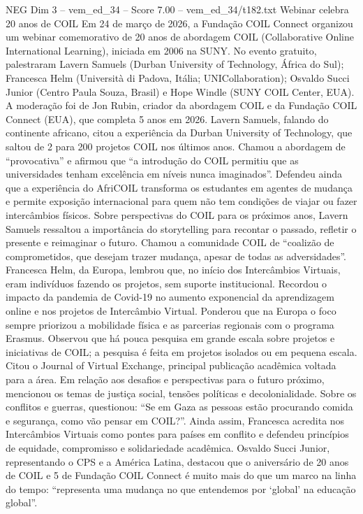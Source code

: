 \begin{textsample}{NEG Dim 3 – vem\_ed\_34 – Score 7.00 – vem\_ed\_34/t182.txt}  \label{ex:f3_neg_125}
Webinar celebra 20 anos de COIL Em 24 de março de 2026, a Fundação COIL Connect organizou um webinar comemorativo de 20 anos de abordagem COIL (Collaborative Online International Learning), iniciada em 2006 na SUNY.
No evento gratuito, palestraram Lavern Samuels (Durban University of Technology, África do Sul); Francesca Helm (Università di Padova, Itália; UNICollaboration); Osvaldo Succi Junior (Centro Paula Souza, Brasil) e Hope Windle (SUNY COIL Center, EUA).
A moderação foi de Jon Rubin, criador da abordagem COIL e da Fundação COIL Connect (EUA), que completa 5 anos em 2026.
Lavern Samuels, falando do continente africano, citou a experiência da Durban University of Technology, que saltou de 2 para 200 projetos COIL nos últimos anos.
Chamou a abordagem de “provocativa” e afirmou que “a introdução do COIL permitiu que as universidades tenham excelência em níveis nunca imaginados”.
Defendeu ainda que a experiência do AfriCOIL transforma os estudantes em agentes de mudança e permite exposição internacional para quem não tem condições de viajar ou fazer intercâmbios físicos.
Sobre perspectivas do COIL para os próximos anos, Lavern Samuels ressaltou a importância do storytelling para recontar o passado, refletir o presente e reimaginar o futuro.
Chamou a comunidade COIL de “coalizão de comprometidos, que desejam trazer mudança, apesar de todas as adversidades”.
Francesca Helm, da Europa, lembrou que, no início dos Intercâmbios Virtuais, eram indivíduos fazendo os projetos, sem suporte institucional.
Recordou o impacto da pandemia de Covid-19 no aumento exponencial da aprendizagem online e nos projetos de Intercâmbio Virtual.
Ponderou que na Europa o foco sempre priorizou a mobilidade física e as parcerias regionais com o programa Erasmus.
Observou que há pouca pesquisa em grande escala sobre projetos e iniciativas de COIL; a pesquisa é feita em projetos isolados ou em pequena escala.
Citou o Journal of Virtual Exchange, principal publicação acadêmica voltada para a área.
Em relação aos desafios e perspectivas para o futuro próximo, mencionou os temas de justiça social, tensões políticas e decolonialidade.
Sobre os conflitos e guerras, questionou: “Se em Gaza as pessoas estão procurando comida e segurança, como vão pensar em COIL?”.
Ainda assim, Francesca acredita nos Intercâmbios Virtuais como pontes para países em conflito e defendeu princípios de equidade, compromisso e solidariedade acadêmica.
Osvaldo Succi Junior, representando o CPS e a América Latina, destacou que o aniversário de 20 anos de COIL e 5 de Fundação COIL Connect é muito mais do que um marco na linha do tempo: “representa uma mudança no que entendemos por ‘global’ na educação global”.

\end{textsample}
